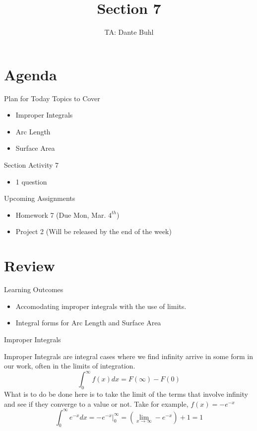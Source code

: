 \documentclass{beamer}
\title{Section 7}
\author{TA: Dante Buhl}
\institute{UCSC Math-19B}
\begin{document}
\newcommand{\bmp}[1]{\begin{minipage}{#1\textwidth}}
\newcommand{\emp}{\end{minipage}}


\frame{\titlepage}

\section{Agenda}
\begin{frame}{Plan for Today}
    Topics to Cover
    \begin{itemize}
        \item Improper Integrals
        \item Arc Length
        \item Surface Area
    \end{itemize}
    Section Activity 7
    \begin{itemize}
        \item 1 question
    \end{itemize}
    Upcoming Assignments
    \begin{itemize}
        \item Homework 7 (Due Mon, Mar. $4^{th}$)
        \item Project 2 (Will be released by the end of the week)
    \end{itemize}
\end{frame}


\section{Review}
\begin{frame}{Learning Outcomes}
    \begin{itemize}
        \item Accomodating improper integrals with the use of limits. 
        \item Integral forms for Arc Length and Surface Area
    \end{itemize}
\end{frame}

\begin{frame}{Improper Integrals}

Improper Integrals are integral cases where we find infinity arrive in some form in our work, often in the limits of integration.
\[
    \int_0^{\infty} f(x) dx = F(\infty) - F(0)
\]
What is to do be done here is to take the limit of the terms that involve infinity and see if they converge to a value or not. Take for example, $f(x) = -e^{-x}$
\[
    \int_0^{\infty} e^{-x}dx = -e^{-x}\Big|_0^{\infty} = \left(\lim_{x\to \infty} -e^{-x}\right) + 1 = 1
\]


\end{frame}
\end{document}
